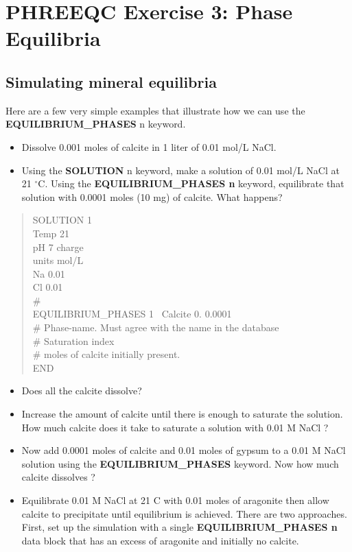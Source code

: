 \section[PHREEQC Exercise 3: Phase Equilibria]{PHREEQC Exercise 3: Phase Equilibria}
\subsection[Simulating mineral equilibria]{Simulating mineral equilibria}

Here are a few very simple examples that illustrate how we can use the 
{\color{red} \textbf{EQUILIBRIUM\_PHASES}} n keyword.

\begin{itemize}
\item Dissolve 0.001 moles of calcite in 1 liter of 0.01 mol/L NaCl.

\item Using the {\color{red} \textbf{SOLUTION}} n keyword, make a solution of 0.01 mol/L NaCl at 21 $^\circ$C. Using the {\color{red} \textbf{EQUILIBRIUM\_PHASES n}} keyword, equilibrate that solution with 0.0001 moles (10 mg) of calcite. What happens?

\end{itemize}

\begin{quote}
{\color{red}SOLUTION 1 \\ 
Temp	21 \\
pH	7 charge \\
units  mol/L \\
Na  0.01 \\
Cl  0.01 \\
\# \\
EQUILIBRIUM\_PHASES 1 \
Calcite  0.  0.0001 \\
\# Phase-name.  Must agree with the name in the database \\
\# Saturation index \\
\# moles of calcite initially present. \\
END }\\
\end{quote}

\begin{itemize}
\item Does all the calcite dissolve? 
\item Increase the amount of calcite until there is enough to saturate the solution. How much calcite does it take to saturate a solution with 0.01 M NaCl ?

\item Now add 0.0001 moles of calcite and 0.01 moles of gypsum to a 0.01 M NaCl solution 
using the {\color{red} \textbf{EQUILIBRIUM\_PHASES}} keyword. Now how much calcite dissolves ?

\item Equilibrate 0.01 M NaCl at 21 C with 0.01 moles of aragonite then allow calcite to precipitate until equilibrium is achieved.
There are two approaches. First, set up the simulation with a single {\color{red} \textbf{EQUILIBRIUM\_PHASES n}} data block that has an excess of aragonite and initially no calcite.

\end{itemize}

